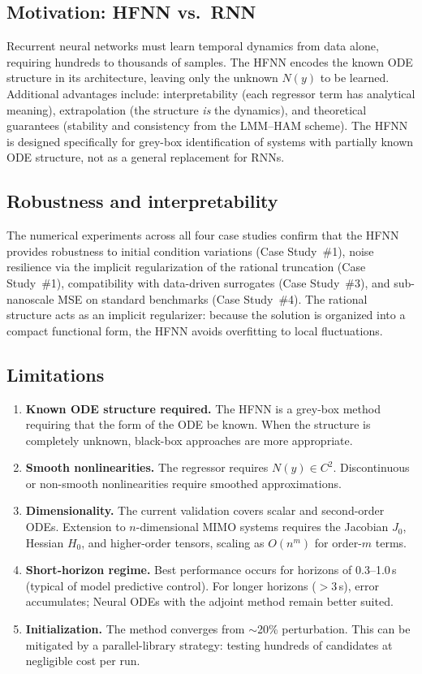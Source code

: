 \documentclass[preprint,12pt]{elsarticle}
\begin{document}
\subsection{Motivation: HFNN vs.\ RNN}
Recurrent neural networks must learn temporal dynamics from data alone, requiring hundreds to thousands of samples. The HFNN encodes the known ODE structure in its architecture, leaving only the unknown $N(y)$ to be learned. Additional advantages include: interpretability (each regressor term has analytical meaning), extrapolation (the structure \emph{is} the dynamics), and theoretical guarantees (stability and consistency from the LMM--HAM scheme). The HFNN is designed specifically for grey-box identification of systems with partially known ODE structure, not as a general replacement for RNNs.

\subsection{Robustness and interpretability}
The numerical experiments across all four case studies confirm that the HFNN provides robustness to initial condition variations (Case Study~\#1), noise resilience via the implicit regularization of the rational truncation (Case Study~\#1), compatibility with data-driven surrogates (Case Study~\#3), and sub-nanoscale MSE on standard benchmarks (Case Study~\#4). The rational structure acts as an implicit regularizer: because the solution is organized into a compact functional form, the HFNN avoids overfitting to local fluctuations.

\subsection{Limitations}
\label{sec:limitations}
\begin{enumerate}
\item[(a)] \textbf{Known ODE structure required.} The HFNN is a grey-box method requiring that the form of the ODE be known. When the structure is completely unknown, black-box approaches are more appropriate.
\item[(b)] \textbf{Smooth nonlinearities.} The regressor requires $N(y) \in C^2$. Discontinuous or non-smooth nonlinearities require smoothed approximations.
\item[(c)] \textbf{Dimensionality.} The current validation covers scalar and second-order ODEs. Extension to $n$-dimensional MIMO systems requires the Jacobian $J_0$, Hessian $H_0$, and higher-order tensors, scaling as $O(n^m)$ for order-$m$ terms.
\item[(d)] \textbf{Short-horizon regime.} Best performance occurs for horizons of 0.3--1.0\,s (typical of model predictive control). For longer horizons ($>3$\,s), error accumulates; Neural ODEs with the adjoint method remain better suited.
\item[(e)] \textbf{Initialization.} The method converges from $\sim$20\% perturbation. This can be mitigated by a parallel-library strategy: testing hundreds of candidates at negligible cost per run.
\end{enumerate}
\end{document}

